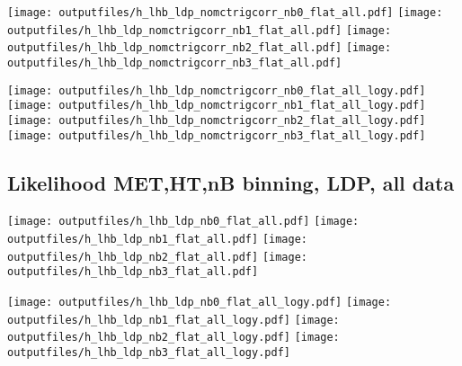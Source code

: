\documentclass[11pt]{article}
\begin{document}
    \noindent
     \texttt{[image: outputfiles/h\_lhb\_ldp\_nomctrigcorr\_nb0\_flat\_all.pdf]}
     \texttt{[image: outputfiles/h\_lhb\_ldp\_nomctrigcorr\_nb1\_flat\_all.pdf]}
     \texttt{[image: outputfiles/h\_lhb\_ldp\_nomctrigcorr\_nb2\_flat\_all.pdf]}
     \texttt{[image: outputfiles/h\_lhb\_ldp\_nomctrigcorr\_nb3\_flat\_all.pdf]}

    \noindent
     \texttt{[image: outputfiles/h\_lhb\_ldp\_nomctrigcorr\_nb0\_flat\_all\_logy.pdf]}
     \texttt{[image: outputfiles/h\_lhb\_ldp\_nomctrigcorr\_nb1\_flat\_all\_logy.pdf]}
     \texttt{[image: outputfiles/h\_lhb\_ldp\_nomctrigcorr\_nb2\_flat\_all\_logy.pdf]}
     \texttt{[image: outputfiles/h\_lhb\_ldp\_nomctrigcorr\_nb3\_flat\_all\_logy.pdf]}

   \clearpage

    \subsection{ Likelihood MET,HT,nB binning, LDP, all data}

    \noindent
     \texttt{[image: outputfiles/h\_lhb\_ldp\_nb0\_flat\_all.pdf]}
     \texttt{[image: outputfiles/h\_lhb\_ldp\_nb1\_flat\_all.pdf]}
     \texttt{[image: outputfiles/h\_lhb\_ldp\_nb2\_flat\_all.pdf]}
     \texttt{[image: outputfiles/h\_lhb\_ldp\_nb3\_flat\_all.pdf]}

    \noindent
     \texttt{[image: outputfiles/h\_lhb\_ldp\_nb0\_flat\_all\_logy.pdf]}
     \texttt{[image: outputfiles/h\_lhb\_ldp\_nb1\_flat\_all\_logy.pdf]}
     \texttt{[image: outputfiles/h\_lhb\_ldp\_nb2\_flat\_all\_logy.pdf]}
     \texttt{[image: outputfiles/h\_lhb\_ldp\_nb3\_flat\_all\_logy.pdf]}

   \clearpage


\end{document}
